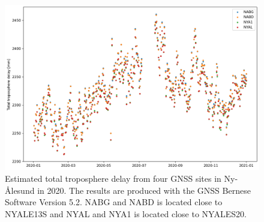\documentclass[natbib,twocolumn,twoside]{svmultiag}
\begin{document}
\begin{figure}
\includegraphics[width=\linewidth]{figure/GNSS_trop_tot}
\caption{Estimated total troposphere delay from four GNSS sites in Ny-\AA lesund in 2020. The results are produced with the GNSS
Bernese Software Version 5.2. NABG and NABD is located close to NYALE13S and NYAL and NYA1 is located close to NYALES20.}
\label{fig:gnss}
\end{figure}
\end{document}

